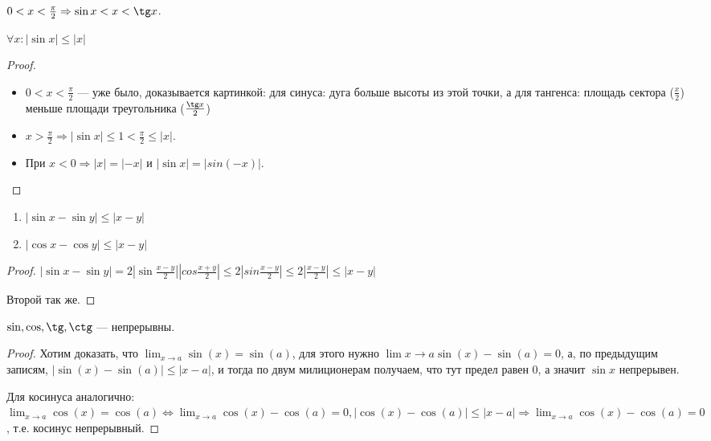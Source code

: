 \begin{theorem}
    $0 < x < \frac{\pi}{2} \Rightarrow \sin x < x < \tg x$.
\end{theorem}
\begin{consequence}
    $\forall x: |\sin x| \le |x|$
\end{consequence}
\begin{proof}
\slashn
    \begin{itemize}
	    \item $0 < x < \frac{\pi}{2}$ --- уже было, доказывается картинкой: для синуса: дуга больше высоты из этой точки, а для тангенса: площадь сектора ($\frac{x}2$) меньше площади треугольника ($\frac{\tg x}2$)
        \item $x > \frac{\pi}{2} \Rightarrow |\sin x| \le 1 < \frac{\pi}{2} \le |x|$.
        \item При $x < 0 \Rightarrow |x| = |-x|$ и  $|\sin x| = |sin(-x)|$.
    \end{itemize}
\end{proof}
\begin{consequence}
\slashn
\begin{enumerate}
    \item $|\sin x - \sin y| \le |x-y|$
    \item $|\cos x - \cos y| \le |x-y|$
\end{enumerate}
\end{consequence}
\begin{proof}
    $|\sin x - \sin y| = 2|\sin \frac{x-y}{2}||cos \frac{x+y}{2}| \le 2 |sin \frac{x-y}{2}| \le 2 |\frac{x-y}{2}| \le |x-y|$ 

    Второй так же.
\end{proof}
\begin{theorem}
    $\sin, \cos, \tg, \ctg$ --- непрерывны.
\end{theorem}
\begin{proof}
	Хотим доказать, что $\lim_{x \to a} \sin(x) = \sin(a)$, для этого нужно $\lim{x \to a} \sin(x) - \sin(a) = 0$, а, по предыдущим записям, $|\sin(x) - \sin(a)| \le |x - a|$, и тогда по двум милиционерам получаем, что тут предел равен 0, а значит $\sin x$ непрерывен.

	Для косинуса аналогично: $\lim_{x \to a} \cos(x) = \cos(a) \iff \lim_{x \to a} \cos(x) - \cos(a) = 0, |\cos(x) - \cos(a)| \le |x - a| \Rightarrow \lim_{x \to a} \cos(x) - \cos(a) = 0$, т.е. косинус непрерывный.
\end{proof}

